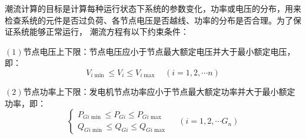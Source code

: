 



潮流计算的目标是计算每种运行状态下系统的参数变化，功率或电压的分布，用来检查系统的元件是否过负荷、各节点电压是否越线、功率的分布是否合理。为了保证系统能够正常运行，
潮流方程有以下约束条件：

$(1)$节点电压上下限：节点电压应小于节点最大额定电压并大于最小额定电压，即：
\begin{equation}
  V_{i \min } \leq V_{i} \leq V_{i \max } \quad(i=1,2, \cdots n)
  \end{equation}

$(2)$节点功率上下限：发电机节点功率应小于节点最大额定功率并大于最小额定功率，即：
\begin{equation}
\left\{\begin{array}{l}{P_{G i \min } \leq P_{G i} \leq P_{G i \max }} \\ {Q_{G i \min } \leq Q_{G i} \leq Q_{G i \max }}\end{array} \quad\left(i=1,2, \cdots G_{n}\right)\right.
\end{equation}

